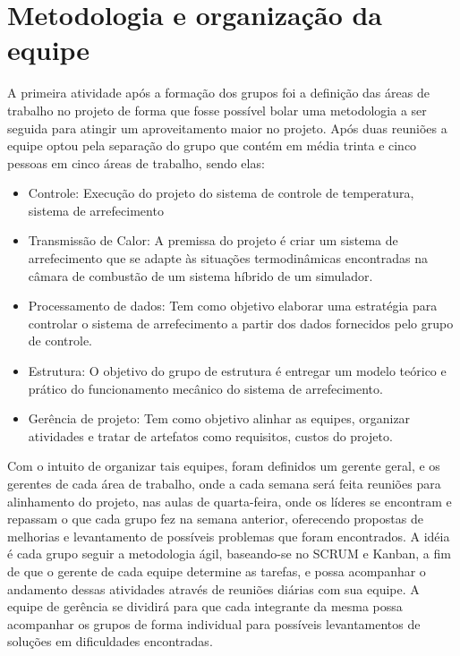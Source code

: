 \chapter{Metodologia e organização da equipe}

A primeira atividade após a formação dos grupos foi a definição das áreas de trabalho no projeto de forma que fosse possível bolar uma metodologia a ser seguida para atingir um aproveitamento maior no projeto.
Após duas reuniões a equipe optou pela separação do grupo que contém em média trinta e cinco pessoas em cinco áreas de trabalho, sendo elas:

\begin{itemize}
\item Controle: Execução do projeto do sistema de controle de temperatura, sistema de arrefecimento
\item Transmissão de Calor: A premissa do projeto é criar um sistema de arrefecimento que se adapte às situações termodinâmicas encontradas na câmara de combustão de um sistema híbrido de um simulador.
\item Processamento de dados: Tem como objetivo elaborar uma estratégia para controlar o sistema de arrefecimento a partir dos dados fornecidos pelo grupo de controle.
\item Estrutura: O objetivo do grupo de estrutura é entregar um modelo teórico e prático do funcionamento mecânico do sistema de arrefecimento.
\item Gerência de projeto: Tem como objetivo alinhar as equipes, organizar atividades e tratar de artefatos como requisitos, custos do projeto.
\end{itemize}

Com o intuito de organizar tais equipes, foram definidos um gerente geral, e os gerentes de cada área de trabalho, onde a cada semana será feita reuniões para alinhamento do projeto, nas aulas de quarta-feira, onde os líderes se encontram e repassam o que cada grupo fez na semana anterior, oferecendo propostas de melhorias e levantamento de possíveis problemas que foram encontrados.
A idéia é cada grupo seguir a metodologia ágil, baseando-se no SCRUM e Kanban, a fim de que o gerente de cada equipe determine as tarefas, e possa acompanhar o andamento dessas atividades através de reuniões diárias com sua equipe.
A equipe de gerência se dividirá para que cada integrante da mesma possa acompanhar os grupos de forma individual para possíveis levantamentos de soluções em dificuldades encontradas.
